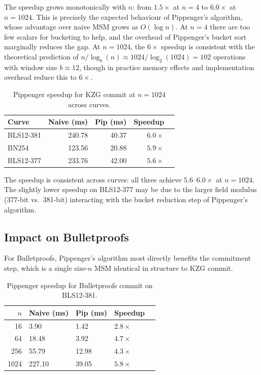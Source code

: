 The speedup grows monotonically with $n$: from $1.5\times$ at $n = 4$
to $6.0\times$ at $n = 1024$. This is precisely the expected behaviour
of Pippenger's algorithm, whose advantage over naive MSM grows as
$O(\log n)$. At $n = 4$ there are too few scalars for bucketing to
help, and the overhead of Pippenger's bucket sort marginally reduces
the gap. At $n = 1024$, the $6\times$ speedup is consistent with the
theoretical prediction of $n / \log_b(n) \approx 1024 / \log_2(1024)
= 102$ operations with window size $b \approx 12$, though in practice
memory effects and implementation overhead reduce this to $6\times$.


\begin{table}[H]
\centering
\caption{Pippenger speedup for KZG commit at $n = 1024$ across curves.}
\label{tab:pip-kzg-curves}
\begin{tabular}{lrrrr}
\toprule
\textbf{Curve} & \textbf{Naive (ms)} & \textbf{Pip (ms)} & \textbf{Speedup} \\
\midrule
BLS12-381 & 240.78 & 40.37 & $6.0\times$ \\
BN254     & 123.56 & 20.88 & $5.9\times$ \\
BLS12-377 & 233.76 & 42.00 & $5.6\times$ \\
\bottomrule
\end{tabular}
\end{table}

The speedup is consistent across curves: all three achieve
$5.6$--$6.0\times$ at $n = 1024$. The slightly lower speedup on
BLS12-377 may be due to the larger field modulus (377-bit vs.\
381-bit) interacting with the bucket reduction step of Pippenger's
algorithm.

\subsection{Impact on Bulletproofs}

For Bulletproofs, Pippenger's algorithm most directly benefits the
commitment step, which is a single size-$n$ MSM identical in structure
to KZG commit.

\begin{table}[H]
\centering
\caption{Pippenger speedup for Bulletproofs commit on BLS12-381.}
\label{tab:pip-bp-381}
\begin{tabular}{rllll}
\toprule
$n$ & \textbf{Naive (ms)} & \textbf{Pip (ms)} & \textbf{Speedup} \\
\midrule
16   & 3.90   & 1.42  & $2.8\times$ \\
64   & 18.48  & 3.92  & $4.7\times$ \\
256  & 55.79  & 12.98 & $4.3\times$ \\
1024 & 227.10 & 39.05 & $5.8\times$ \\
\bottomrule
\end{tabular}
\end{table}


